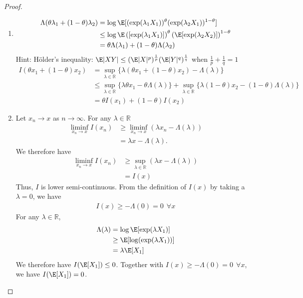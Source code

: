\documentclass{article}
\begin{document}
	\begin{proof}$\ $\\
	\begin{enumerate}[label=(\alph*)]
	\item
		\begin{align*}
		   \Lambda(\theta\lambda_1+(1-\theta)\lambda_2)& =\log\E[(\exp(\lambda_1 X_1))^\theta (\exp(\lambda_2X_1))^{1-\theta}] \\
		   & \leq\log\E\left([\exp(\lambda_1 X_1)]\right)^\theta\left(\E[\exp(\lambda_2 X_2)]\right)^{1-\theta} \\
		   & =\theta\Lambda(\lambda_1)+(1-\theta)\Lambda(\lambda_2)
		\end{align*}
		Hint: H{\"o}lder's inequality: $\E|XY|\leq(\E|X|^p)^{\frac{1}{p}} (\E|Y|^q)^{\frac{1}{q}}$ when $\frac{1}{p}+\frac{1}{q}=1$
		\begin{align*}
		   I(\theta x_1+(1-\theta)x_2)
		   &=\sup\limits_{\lambda\in\mathbb{R}}\{\lambda(\theta x_1+(1-\theta)x_2)-\Lambda(\lambda)\}\\
		   &\leq \sup\limits_{\lambda\in\mathbb{R}}\{\lambda\theta x_1-\theta\Lambda(\lambda)\}+\sup\limits_{\lambda\in\mathbb{R}}\{\lambda(1-\theta)x_2-(1-\theta)\Lambda(\lambda)\}\\ &=\theta I(x_1)+(1-\theta)I(x_2)
		\end{align*}
	\item
		Let $x_n\rightarrow x$ as $n\rightarrow\infty $. For any $\lambda\in\mathbb{R}$
		\begin{align*}
		  \liminf\limits_{x_n\rightarrow x} I (x_n)& \geq\liminf\limits_{x_n\rightarrow x}(\lambda x_n-\Lambda(\lambda))\\
		  &=\lambda x-\Lambda(\lambda).
		\end{align*}
	We therefore have 
		\begin{align*}
		  \liminf\limits_{x_n\rightarrow x} I (x_n)& \geq\sup\limits_{\lambda\in\mathbb{R}}(\lambda x-\Lambda(\lambda))\\
		  &=I(x)
		\end{align*}
		Thus, $I$ is lower semi-continuous. From the definition of $I(x)$ by taking a $\lambda =0$, we have
		\begin{align*}
		I(x)\geq  -\Lambda(0)=0\ \ \forall x
		\end{align*}
		For any $\lambda \in \mathbb{R}$,
		\begin{align*}
		\Lambda(\lambda)&=\log\E[\exp(\lambda X_1)]\\
		&\geq\E[\log(\exp(\lambda X_1))]\\
		&=\lambda \E[X_1]
		\end{align*}
	We therefore have $I(\E[X_1])\leq 0$. Together with $	I(x)\geq  -\Lambda(0)=0\ \ \forall x$, we have $I(\E[X_1])=0$.
	

\end{enumerate}
\end{proof}
\end{document}

